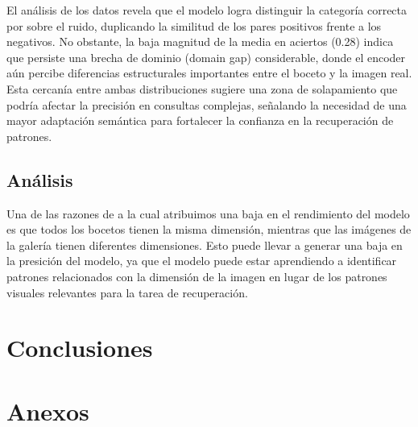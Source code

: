 \documentclass[11pt]{article}
\begin{document}
El análisis de los datos revela que el modelo logra distinguir la categoría correcta por sobre el ruido, duplicando la similitud de los pares positivos frente a los negativos. No obstante, la baja magnitud de la media en aciertos (0.28) indica que persiste una brecha de dominio (domain gap) considerable, donde el encoder aún percibe diferencias estructurales importantes entre el boceto y la imagen real. Esta cercanía entre ambas distribuciones sugiere una zona de solapamiento que podría afectar la precisión en consultas complejas, señalando la necesidad de una mayor adaptación semántica para fortalecer la confianza en la recuperación de patrones.


\subsection{Análisis} %
Una de las razones de a la cual atribuimos una baja en el rendimiento del modelo es que todos los bocetos tienen la misma dimensión, mientras que las imágenes de la galería tienen diferentes dimensiones. Esto puede llevar a generar una baja en la presición del modelo, ya que el modelo puede estar aprendiendo a identificar patrones relacionados con la dimensión de la imagen en lugar de los patrones visuales relevantes para la tarea de recuperación. 


\section{Conclusiones}



\newpage

\newpage
\section{Anexos}
\end{document}
